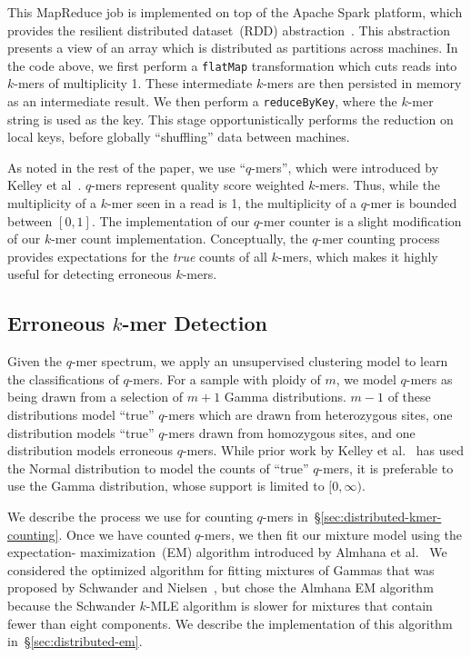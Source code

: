 \documentclass{llncs}
\begin{document}
This MapReduce job is implemented on top of the Apache Spark platform, which provides the resilient
distributed dataset~(RDD) abstraction~\cite{zaharia12}. This abstraction presents a view of an array which
is distributed as partitions across machines. In the code above, we first perform a \texttt{flatMap}
transformation which cuts reads into $k$-mers of multiplicity 1. These intermediate $k$-mers are then
persisted in memory as an intermediate result. We then perform a \texttt{reduceByKey}, where the
$k$-mer string is used as the key. This stage opportunistically performs the reduction on local keys, before 
globally ``shuffling'' data between machines.

As noted in the rest of the paper, we use ``$q$-mers'', which were introduced by Kelley et
al~\cite{kelley10}. $q$-mers represent quality score weighted $k$-mers. Thus, while the multiplicity of a
$k$-mer seen in a read is 1, the multiplicity of a $q$-mer is bounded between $[0,1]$. The implementation
of our $q$-mer counter is a slight modification of our $k$-mer count implementation. Conceptually, the
$q$-mer counting process provides expectations for the \emph{true} counts of all $k$-mers, which makes
it highly useful for detecting erroneous $k$-mers.

\subsection{Erroneous $k$-mer Detection}
\label{sec:detection}

Given the $q$-mer spectrum, we apply an unsupervised clustering model to learn the
classifications of $q$-mers. For a sample with ploidy of $m$, we model $q$-mers as being drawn from
a selection of $m + 1$ Gamma distributions. $m - 1$ of these distributions model ``true'' $q$-mers
which are drawn from heterozygous sites, one distribution models ``true'' $q$-mers drawn from
homozygous sites, and one distribution models erroneous $q$-mers. While prior work by Kelley et
al.~\cite{kelley10} has used the Normal distribution to model the counts of ``true'' $q$-mers, it is
preferable to use the Gamma distribution, whose support is limited to $[0, \infty)$.

We describe the process we use for counting $q$-mers in~\S\ref{sec:distributed-kmer-counting}. Once
we have counted $q$-mers, we then fit our mixture model using the expectation-\linebreak
maximization~(EM) algorithm introduced by Almhana et al.~\cite{almhana06} We considered the
optimized algorithm for fitting mixtures of Gammas that was proposed by Schwander and
Nielsen~\cite{schwander13}, but chose the Almhana EM algorithm because the Schwander $k$-MLE
algorithm is slower for mixtures that contain fewer than eight components. We describe the
implementation of this algorithm in~\S\ref{sec:distributed-em}.
\end{document}
